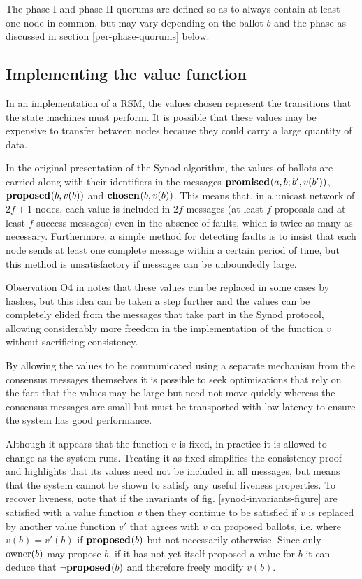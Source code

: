 \documentclass[journal]{IEEEtran}
\begin{document}
The phase-I and phase-II quorums are defined so as to always contain at least
one node in common, but may vary depending on the ballot $b$ and the phase as
discussed in section \ref{per-phase-quorums} below.

\subsection{Implementing the value function}\label{value-function}

In an implementation of a RSM, the values chosen represent the transitions that
the state machines must perform. It is possible that these values may be
expensive to transfer between nodes because they could carry a large quantity
of data.

In the original presentation of the Synod algorithm, the values of ballots are
carried along with their identifiers in the messages $\mathbf{promised}_{}(a,b; b',v(b')
)$, $\mathbf{proposed}_{}( b,v(b))$ and $\mathbf{chosen}_{}( b,v(b) )$. This means that, in a unicast
network of $2f + 1$ nodes, each value is included in $2f$ messages (at least
$f$ proposals and at least $f$ success messages) even in the absence of faults,
which is twice as many as necessary. Furthermore, a simple method for detecting
faults is to insist that each node sends at least one complete message within a
certain period of time, but this method is unsatisfactory if messages can be
unboundedly large.

Observation O4 in \cite{cheap-paxos} notes that these values can be replaced in
some cases by hashes, but this idea can be taken a step further and the values
can be completely elided from the messages that take part in the Synod
protocol, allowing considerably more freedom in the implementation of the
function $v$ without sacrificing consistency.

By allowing the values to be communicated using a separate mechanism from the
consensus messages themselves it is possible to seek optimisations that rely on
the fact that the values may be large but need not move quickly whereas the
consensus messages are small but must be transported with low latency to ensure
the system has good performance.

Although it appears that the function $v$ is fixed, in practice it is allowed
to change as the system runs. Treating it as fixed simplifies the consistency
proof and highlights that its values need not be included in all messages, but
means that the system cannot be shown to satisfy any useful liveness
properties.  To recover liveness, note that if the invariants of fig.
\ref{synod-invariants-figure} are satisfied with a value function $v$ then they
continue to be satisfied if $v$ is replaced by another value function $v'$ that
agrees with $v$ on proposed ballots, i.e. where $v(b) = v'(b)$ if $\mathbf{proposed}_{}(b)$
but not necessarily otherwise. Since only $\mathrm{owner}(b)$ may propose $b$, if it
has not yet itself proposed a value for $b$ it can deduce that $\neg\mathbf{proposed}_{}(b)$
and therefore freely modify $v(b)$.
\end{document}

